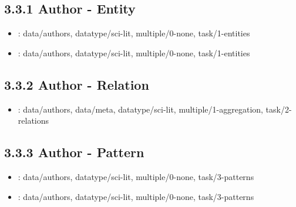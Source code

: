 \begin {refsection}
\section [3.3.1 Author - Entity] {3.3.1 Author - Entity}

\begin {itemize}
\item \cite {kang-2007-netlens:-iterative-exploration-of-content-actor-network}:
    data/authors, datatype/sci-lit, multiple/0-none, task/1-entities


\item \cite {misue-2008-visual-analysis-tool-for-bipartite-networks}:
    data/authors, datatype/sci-lit, multiple/0-none, task/1-entities


\end {itemize}
\printbibliography
\end {refsection}\pagebreak

\begin {refsection}
\section [3.3.2 Author - Relation] {3.3.2 Author - Relation}

\begin {itemize}
\item \cite {chinchilla-rodriguez-2010-new-approach-to-the-visualization-of-international-scientific-collaboration}:
    data/authors, data/meta, datatype/sci-lit, multiple/1-aggregation, task/2-relations


\end {itemize}
\printbibliography
\end {refsection}\pagebreak

\begin {refsection}
\section [3.3.3 Author - Pattern] {3.3.3 Author - Pattern}

\begin {itemize}
\item \cite {henry-riche-2007-nodetrix:-a-hybrid-visualization-of-social-networks}:
    data/authors, datatype/sci-lit, multiple/0-none, task/3-patterns


\item \cite {ichise-2005-community-mining-tool-using-bibliography}:
    data/authors, datatype/sci-lit, multiple/0-none, task/3-patterns


\end {itemize}
\printbibliography
\end {refsection}\pagebreak

